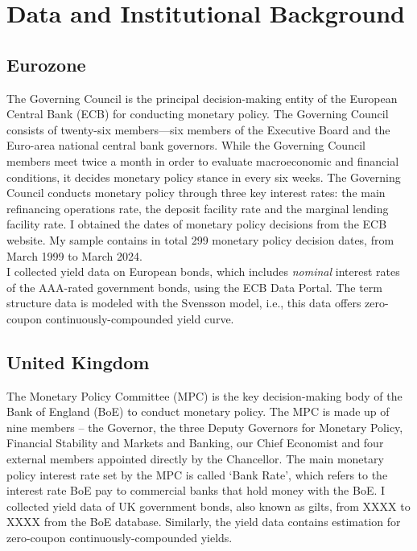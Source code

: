 \section{Data and Institutional Background}

\subsection{Eurozone}

The Governing Council is the principal decision-making entity of the European Central Bank (ECB) for conducting monetary policy. The Governing Council consists of twenty-six members---six members of the Executive Board and the Euro-area national central bank governors. While the Governing Council members meet twice a month in order to evaluate macroeconomic and financial conditions, it decides monetary policy stance in every six weeks. The Governing Council conducts monetary policy through three key interest rates: the main refinancing operations rate, the deposit facility rate and the marginal lending facility rate. I obtained the dates of monetary policy decisions from the ECB website. My sample contains in total 299 monetary policy decision dates, from March 1999 to March 2024. \\

I collected yield data on European bonds, which includes \textit{nominal} interest rates of the AAA-rated government bonds, using the ECB Data Portal. The term structure data is modeled with the Svensson model, i.e., this data offers zero-coupon continuously-compounded yield curve.

\subsection{United Kingdom}

The Monetary Policy Committee (MPC) is the key decision-making body of the Bank of England (BoE) to conduct monetary policy. The MPC is made up of nine members – the Governor, the three Deputy Governors for Monetary Policy, Financial Stability and Markets and Banking, our Chief Economist and four external members appointed directly by the Chancellor. The main monetary policy interest rate set by the MPC is called `Bank Rate', which refers to the interest rate BoE pay to commercial banks that hold money with the BoE. I collected yield data of UK government bonds, also known as gilts, from XXXX to XXXX from the BoE database. Similarly, the yield data contains estimation for zero-coupon continuously-compounded yields. \citet{anderson2001new}

